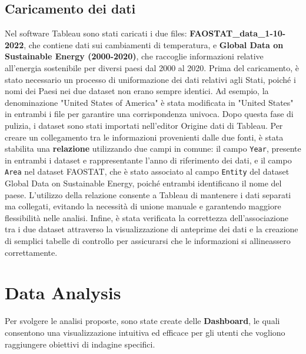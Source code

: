 \subsection{Caricamento dei dati}
Nel software Tableau sono stati caricati i due files: \textbf{FAOSTAT\_data\_1-10-2022}, che contiene dati sui cambiamenti di temperatura, e \textbf{Global Data on Sustainable Energy (2000-2020)}, che raccoglie informazioni relative all’energia sostenibile per diversi paesi dal 2000 al 2020. Prima del caricamento, è stato necessario un processo di uniformazione dei dati relativi agli Stati, poiché i nomi dei Paesi nei due dataset non erano sempre identici. Ad esempio, la denominazione "United States of America" è stata modificata in "United States" in entrambi i file per garantire una corrispondenza univoca. Dopo questa fase di pulizia, i dataset sono stati importati nell’editor Origine dati di Tableau. Per creare un collegamento tra le informazioni provenienti dalle due fonti, è stata stabilita una \textbf{relazione} utilizzando due campi in comune: il campo \texttt{Year}, presente in entrambi i dataset e rappresentante l’anno di riferimento dei dati, e il campo \texttt{Area} nel dataset FAOSTAT, che è stato associato al campo \texttt{Entity} del dataset Global Data on Sustainable Energy, poiché entrambi identificano il nome del paese. L’utilizzo della relazione consente a Tableau di mantenere i dati separati ma collegati, evitando la necessità di unione manuale e garantendo maggiore flessibilità nelle analisi. Infine, è stata verificata la correttezza dell’associazione tra i due dataset attraverso la visualizzazione di anteprime dei dati e la creazione di semplici tabelle di controllo per assicurarsi che le informazioni si allineassero correttamente.

\section{Data Analysis}

Per svolgere le analisi proposte, sono state create delle \textbf{Dashboard}, le quali consentono una visualizzazione intuitiva ed efficace per gli utenti che vogliono raggiungere obiettivi di indagine specifici. 

